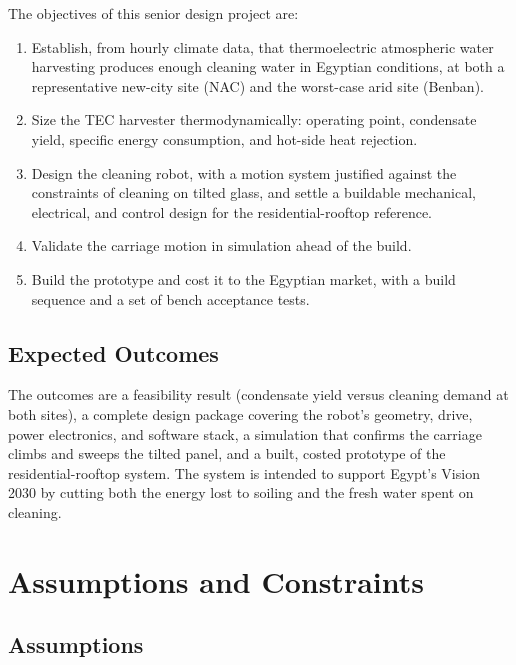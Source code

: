 \documentclass[12pt,a4paper]{report}   %
\begin{document}
The objectives of this senior design project are:
\begin{enumerate}[leftmargin=*]
  \item Establish, from hourly climate data, that thermoelectric atmospheric water
  harvesting produces enough cleaning water in Egyptian conditions, at both a
  representative new-city site (NAC) and the worst-case arid site (Benban).
  \item Size the TEC harvester thermodynamically: operating point, condensate yield,
  specific energy consumption, and hot-side heat rejection.
  \item Design the cleaning robot, with a motion system justified against the constraints of
  cleaning on tilted glass, and settle a buildable mechanical, electrical, and control design
  for the residential-rooftop reference.
  \item Validate the carriage motion in simulation ahead of the build.
  \item Build the prototype and cost it to the Egyptian market, with a build sequence and a
  set of bench acceptance tests.
\end{enumerate}

\section{Expected Outcomes}

The outcomes are a feasibility result (condensate yield versus cleaning demand at both sites),
a complete design package covering the robot's geometry, drive, power electronics, and software
stack, a simulation that confirms the carriage climbs and sweeps the tilted panel, and a built,
costed prototype of the residential-rooftop system. The system is intended to support Egypt's
Vision 2030 by cutting both the energy lost to soiling and the fresh water spent on cleaning.

\chapter{Assumptions and Constraints}
\label{ch:assumptions}

\section{Assumptions}
\end{document}
